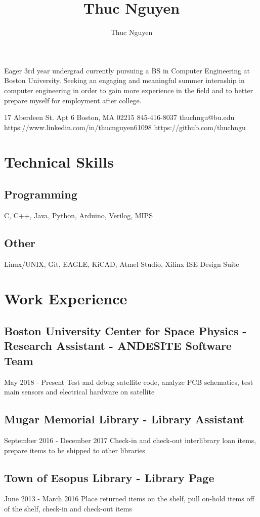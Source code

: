 \documentclass{article}
\begin{document}
\title{Thuc Nguyen}
\author{Thuc Nguyen}
\maketitle

Eager 3rd year undergrad currently pursuing a BS in Computer Engineering at Boston University. Seeking an engaging and meaningful summer internship in computer engineering in order to gain more experience in the field and to better prepare myself for employment after college.

17 Aberdeen St. Apt 6
Boston, MA 02215
845-416-8037
thuchngu@bu.edu
https://www.linkedin.com/in/thucnguyen61098
https://github.com/thuchngu

\section{Technical Skills}
\subsection{Programming}
C, C++, Java, Python, Arduino, Verilog, MIPS
\subsection{Other}
Linux/UNIX, Git, EAGLE, KiCAD, Atmel Studio, Xilinx ISE Design Suite

\section{Work Experience}
\subsection{Boston University Center for Space Physics - Research Assistant - ANDESITE Software Team}
May 2018 - Present
Test and debug satellite code, analyze PCB schematics, test main sensors and electrical hardware on satellite
\subsection{Mugar Memorial Library - Library Assistant}
September 2016 - December 2017
Check-in and check-out interlibrary loan items, prepare items to be shipped to other libraries
\subsection{Town of Esopus Library - Library Page}
June 2013 - March 2016
Place returned items on the shelf, pull on-hold items off of the shelf, check-in and check-out items
\end{document}
